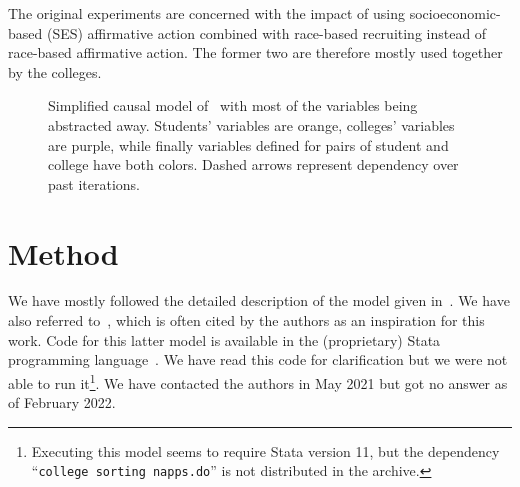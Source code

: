 The original experiments are concerned with the impact of using socioeconomic-based (SES) affirmative action combined with race-based recruiting instead of race-based affirmative action. The former two are therefore mostly used together by the colleges.

\begin{figure}[ht]
  \centering
  \caption{Simplified causal model of~\cite{reardon2018levels} with most of the variables being abstracted away. 
Students' variables are \colorbox{PuOr-K}{orange}, colleges' variables are \colorbox{PuOr-E}{purple}, while finally variables defined for pairs of student and college have both colors. 
Dashed arrows represent dependency over past iterations.}
  \label{fig:model}
\end{figure}

\section{Method}

We have mostly followed the detailed description of the model given in~\cite[Appendix~C]{reardon2018levels}. 
We have also referred to~\cite{reardon2016agent}, which is often cited by the authors as an inspiration for this work. 
Code for this latter model is available in the (proprietary) Stata programming language~\cite{reardon2016stata}.  
We have read this code for clarification but we were not able to run it\footnote{Executing this model seems to require Stata version 11, but the dependency ``\texttt{college sorting napps.do}'' is not distributed in the archive.}. 
We have contacted the authors in May 2021 but got no
answer as of February 2022.


